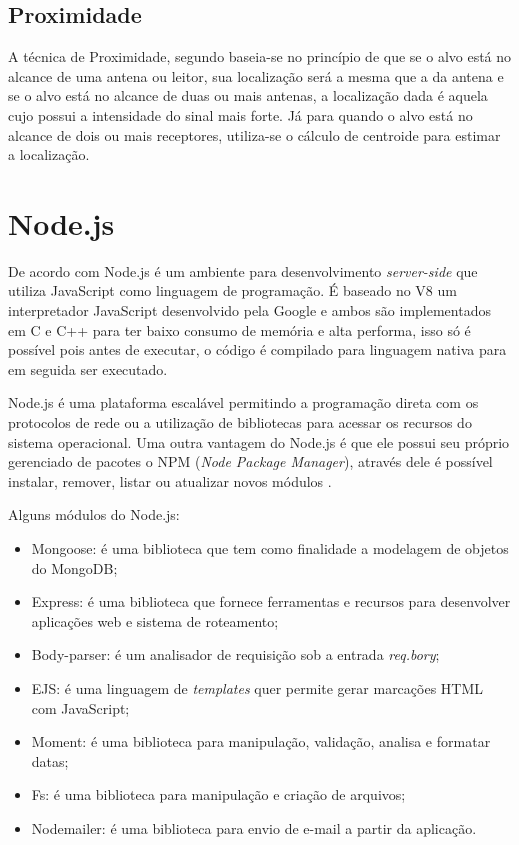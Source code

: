     \subsection{Proximidade}
    A técnica de Proximidade, segundo  baseia-se no princípio de que se o alvo está no alcance de uma antena ou leitor, sua localização será a mesma que a da antena e se o alvo está no alcance de duas ou mais antenas, a localização dada é aquela cujo possui a intensidade do sinal mais forte. Já para  quando o alvo está no alcance de dois ou mais receptores, utiliza-se o cálculo de centroide para estimar a localização.
    
\section{Node.js}
    De acordo com  Node.js é um ambiente para desenvolvimento \textit{server-side} que utiliza JavaScript como linguagem de programação. É baseado no V8 um interpretador JavaScript desenvolvido pela Google e ambos são implementados em C e C++ para ter baixo consumo de memória e alta performa, isso só é possível pois antes de executar, o código é compilado para linguagem nativa para em seguida ser executado.
    \par
    Node.js é uma plataforma escalável permitindo a programação direta com os protocolos de rede ou a utilização de bibliotecas para acessar os recursos do sistema operacional. Uma outra vantagem do Node.js é que ele possui seu próprio gerenciado de pacotes o NPM (\textit{Node Package Manager}), através dele é possível instalar, remover, listar ou atualizar novos módulos \cite{pereira2014aplicacoes}.
    \par
    Alguns módulos do Node.js:
    \begin{itemize}
        \item Mongoose: é uma biblioteca que tem como finalidade a modelagem de objetos do MongoDB;   
        \item Express: é uma biblioteca que fornece ferramentas e recursos para desenvolver aplicações web e sistema de roteamento;
        \item Body-parser: é um analisador de requisição sob a entrada \textit{req.bory};
        \item EJS: é uma linguagem de \textit{templates} quer permite gerar marcações HTML com JavaScript;
        \item Moment: é uma biblioteca para manipulação, validação, analisa e formatar datas;
        \item Fs: é uma biblioteca para manipulação e criação de arquivos;
        \item Nodemailer: é uma biblioteca para envio de e-mail a partir da aplicação.
    \end{itemize}
